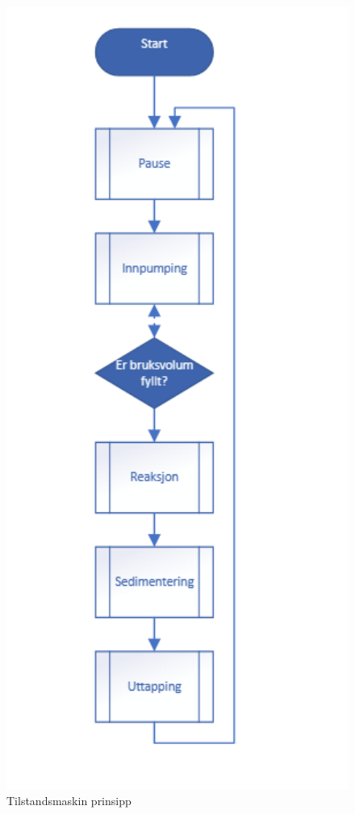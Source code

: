 \begin{figure}[htbp]
    \centering
    \includegraphics[width=1\textwidth]{Bilder/tilstandsmaskin_prinsipp.png}
    \caption{Tilstandsmaskin prinsipp}\label{fig:Tilstandsmaskin prinsipp}
\end{figure}

